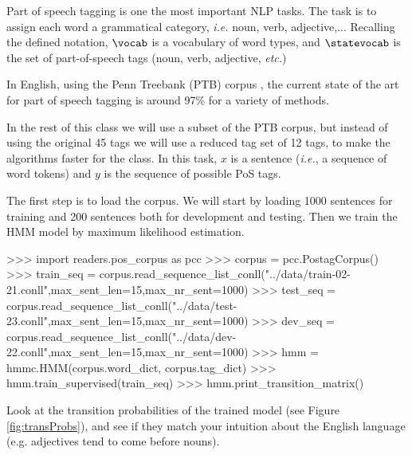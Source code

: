 Part of speech tagging is one the most important NLP tasks. The
task is to assign each word a grammatical category, \emph{i.e.} noun,
verb, adjective,... Recalling the defined notation, $\vocab$ is a 
vocabulary of word types, and 
$\statevocab$ is the set of part-of-speech tags 
(noun, verb, adjective, \emph{etc.})

In English, using the Penn Treebank (PTB) corpus \citep{pennTreeBank}, the current
state of the art for part of speech tagging is around 97\% for a
variety of methods.%

In the rest of this class we will use a subset of the PTB corpus, but
instead of using the original 45 tags we will use a reduced tag set of
12 tags, to make the algorithms faster for the
class. In this task, $x$ is a sentence (\emph{i.e.}, a sequence of word tokens) and $y$
is the sequence of possible PoS tags.

The first step is to load the corpus. We will start by loading
1000 sentences for training and 200 sentences both for development and
testing. Then we train the HMM model by maximum 
likelihood estimation.
\begin{python}
>>> import readers.pos_corpus as pcc
>>> corpus = pcc.PostagCorpus()
>>> train_seq = corpus.read_sequence_list_conll("../data/train-02-21.conll",max_sent_len=15,max_nr_sent=1000)
>>> test_seq = corpus.read_sequence_list_conll("../data/test-23.conll",max_sent_len=15,max_nr_sent=1000)
>>> dev_seq = corpus.read_sequence_list_conll("../data/dev-22.conll",max_sent_len=15,max_nr_sent=1000)
>>> hmm = hmmc.HMM(corpus.word_dict, corpus.tag_dict)
>>> hmm.train_supervised(train_seq)
>>> hmm.print_transition_matrix()
\end{python}


Look at the transition probabilities of the trained model
 (see
Figure \ref{fig:transProbs}), and see if they match your intuition
about the English language (e.g. adjectives tend to come before nouns).

